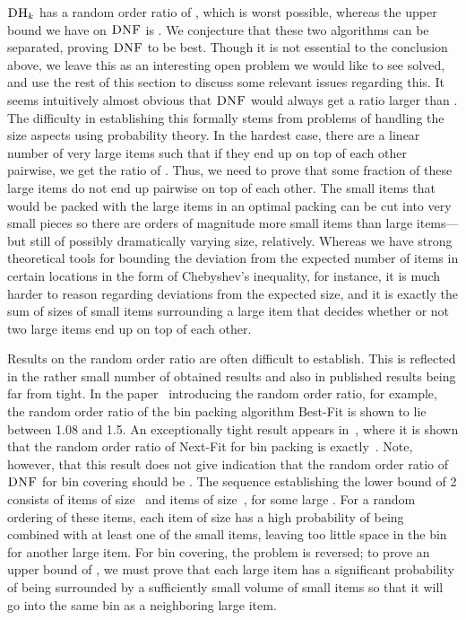 \documentclass[11pt]{article}
\newcommand{\DNF}{\ensuremath{\operatorname{\textsc{DNF}}}\xspace}
\newcommand{\DHk}{{\ensuremath{\textsc{DH}_k}}\xspace}
\begin{document}
\DHk has a random order ratio of ,
which is worst possible, whereas the upper bound we have on
\DNF is . We conjecture that these two algorithms
can be separated, proving \DNF to be best.
Though it is not essential to the conclusion above,
we leave this as an interesting open problem we would like to see solved,
and use the rest of this section to discuss some relevant issues
regarding this.
It seems intuitively almost obvious that
\DNF would always get a ratio larger than .
The difficulty in establishing this formally stems from problems of
handling the size aspects using probability theory. In the hardest
case, there are a linear number of very large items such that if
they end up on top of each other pairwise, we get the ratio of . 
Thus, we need to prove that some fraction of these large items do not end up pairwise
on top of each other.
The small items that would be packed with the large items in an
optimal packing can be cut into very small pieces so there are
orders of magnitude more small items than large items---but still of
possibly dramatically varying size, relatively.
Whereas we have strong theoretical tools for
bounding the deviation from the expected
number of items in certain locations in the form of
Chebyshev's inequality, for instance, it is much harder to reason
regarding deviations from the expected size, and it is exactly the sum
of sizes of small items surrounding a large item that decides whether or not
two large items end up on top of each other.

Results on the random order ratio are often difficult to establish.
This is reflected in the rather small
number of obtained results and also in published
results being far from tight. In the paper~\cite{K96}
introducing the random order ratio, for example,
the random order ratio of the bin
packing algorithm Best-Fit is shown to lie between 1.08 and 1.5.
An exceptionally tight result appears in~\cite{CCRZ08}, where it is shown
that the random order ratio of Next-Fit for bin packing is exactly~.
Note, however, that this result does not give indication that the
random order ratio of \DNF for bin covering should be
. The sequence establishing the lower bound of 2 consists of
 items of size~ and  items of size~, for some large . For a random ordering of these
items, each item of size  has a high probability of
being combined with at least one of the small items, leaving too
little space in the bin for another large item. 
For bin covering, the problem is reversed;
to prove an upper bound of ,
we must prove that each large item has a
significant probability of being surrounded by a sufficiently small
volume of small items so that it will go into the same bin as a
neighboring large item.




\end{document}
